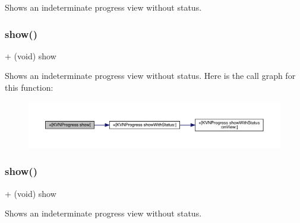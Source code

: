 Shows an indeterminate progress view without status. \mbox{\label{interface_k_v_n_progress_ad27933d0b2a65108404a514029689fb8}} 
\subsubsection{\texorpdfstring{show()}{show()}\hspace{0.1cm}{\footnotesize\ttfamily [2/3]}}
{\footnotesize\ttfamily + (void) show \begin{DoxyParamCaption}{ }\end{DoxyParamCaption}}

Shows an indeterminate progress view without status. Here is the call graph for this function\+:\nopagebreak
\begin{figure}[H]
\begin{center}
\leavevmode
\includegraphics[width=350pt]{interface_k_v_n_progress_ad27933d0b2a65108404a514029689fb8_cgraph}
\end{center}
\end{figure}
\mbox{\label{interface_k_v_n_progress_ad27933d0b2a65108404a514029689fb8}} 
\subsubsection{\texorpdfstring{show()}{show()}\hspace{0.1cm}{\footnotesize\ttfamily [3/3]}}
{\footnotesize\ttfamily + (void) show \begin{DoxyParamCaption}{ }\end{DoxyParamCaption}}

Shows an indeterminate progress view without status. \mbox{\label{interface_k_v_n_progress_aca67ff95ae9a6d0ad5237fdc1d5dd34c}} 
